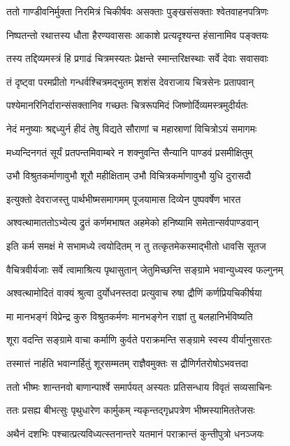 \twolineshloka
{ततो गाण्डीवनिर्मुक्ता निरमित्रं चिकीर्षवः}
{असक्ताः पुङ्खसंसक्ताः श्वेतवाहनपत्रिणः}


\twolineshloka
{निष्पतन्तो रथात्तस्य धौता हैरण्यवाससः}
{आकाशे प्रत्यदृश्यन्त हंसानामिव पङ्क्तयः}


\twolineshloka
{तस्य तद्दिव्यमस्त्रं हि प्रगाढं चित्रमस्यतः}
{प्रेक्षन्ते स्मान्तरिक्षस्थाः सर्वे देवाः सवासवाः}


\twolineshloka
{तं दृष्ट्वा परमप्रीतो गन्धर्वश्चित्रमद्भुतम्}
{शशंस देवराजाय चित्रसेनः प्रतापवान्}


\twolineshloka
{पश्येमानरिनिर्दारान्संसक्तानिव गच्छतः}
{चित्ररूपमिदं जिष्णोर्दिव्यमस्त्रमुदीर्यतः}


\twolineshloka
{नेदं मनुष्याः श्रद्दध्युर्न हीदं तेषु विद्यते}
{सौराणां च महास्राणां विचित्रोऽयं समागमः}


\twolineshloka
{मध्यन्दिनगतं सूर्यं प्रतपन्तमिवाम्बरे}
{न शक्नुवन्ति सैन्यानि पाण्डवं प्रसमीक्षितुम्}


\twolineshloka
{उभौ विश्रुतकर्माणावुभौ शूरौ महीक्षिताम्}
{उभौ विचित्रकर्माणावुभौ युधि दुरासदौ}


\twolineshloka
{इत्युक्तो देवराजस्तु पार्थभीष्मसमागमम्}
{पूजयामास दिव्येन पुष्पवर्षेण भारत}


\twolineshloka
{अश्वत्थामाततोऽभ्येत्य द्रुतं कर्णमभाषत}
{अहमेको हनिष्यामि समेतान्सर्वपाण्डवान्}


\twolineshloka
{इति कर्म समक्षं मे सभामध्ये त्वयोदितम्}
{न तु तत्कृतमेकस्माद्भीतो धावसि सूतज}


\twolineshloka
{वैचित्रवीर्यजाः सर्वे त्वामाश्रित्य पृथासुतान्}
{जेतुमिच्छन्ति सङ्ग्रामे भवान्युध्यस्व फल्गुनम्}


\twolineshloka
{अश्वत्थामोदितं वाक्यं श्रुत्वा दुर्योधनस्तदा}
{प्रत्युवाच रुषा द्रौणिं कर्णप्रियचिकीर्षया}


\twolineshloka
{मा मानभङ्गं विप्रेन्द्र कुरु विश्रुतकर्मणः}
{मानभङ्गेन राज्ञां तु बलहानिर्भविष्यति}


\twolineshloka
{शूरा वदन्ति सङ्ग्रामे वाचा कर्माणि कुर्वते}
{पराक्रमन्ति सङ्ग्रामे स्वस्य वीर्यानुसारतः}


\twolineshloka
{तस्मात्तं नार्हति भवान्गर्हितुं शूरसम्मतम्}
{राज्ञैवमुक्तः स द्रौणिर्गतरोषोऽभवत्तदा}


\twolineshloka
{ततो भीष्मः शान्तनवो बाणान्पार्श्वे समार्पयत्}
{अस्यतः प्रतिसन्धाय विवृतं सव्यसाचिनः}


\twolineshloka
{ततः प्रसह्य बीभत्सुः पृथुधारेण कार्मुकम्}
{न्यकृन्तद्गृध्रपत्रेण भीष्मस्यामिततेजसः}


\twolineshloka
{अथैनं दशभिः पश्चात्प्रत्यविध्यत्स्तनान्तरे}
{यतमानं पराक्रान्तं कुन्तीपुत्रो धनञ्जयः}


